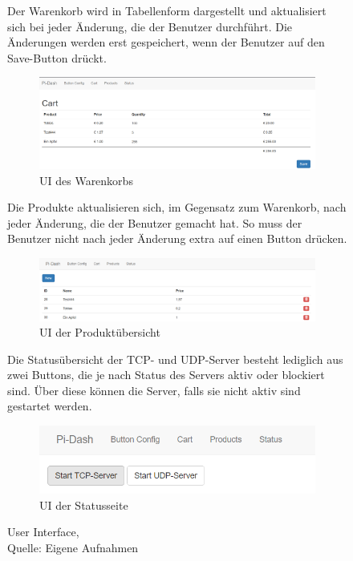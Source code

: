 \begin{figure}[!htb]
Der Warenkorb wird in Tabellenform dargestellt und aktualisiert sich bei jeder Änderung, die der Benutzer durchführt. Die Änderungen werden erst gespeichert, wenn der Benutzer auf den Save-Button drückt.	
  \begin{subfigure}{\linewidth}
	\centering
	\includegraphics[scale=0.4]{Bilder/ui_cart.png}
	\caption[UI des Warenkorbs]{\ac{UI} des Warenkorbs}
  \end{subfigure}\par\medskip
  
Die Produkte aktualisieren sich, im Gegensatz zum Warenkorb, nach jeder Änderung, die der Benutzer gemacht hat. So muss der Benutzer nicht nach jeder Änderung extra auf einen Button drücken.

  \begin{subfigure}{\linewidth}	
	\centering
	\includegraphics[scale=0.4]{Bilder/ui_products.png}
	\caption[UI der Produktübersicht]{\ac{UI} der Produktübersicht}
  \end{subfigure}\par\medskip
  
Die Statusübersicht der \ac{TCP}- und \ac{UDP}-Server besteht lediglich aus zwei Buttons, die je nach Status des Servers aktiv oder blockiert sind. Über diese können die Server, falls sie nicht aktiv sind gestartet werden.

  \begin{subfigure}{\linewidth}
	\centering
	\includegraphics[scale=0.8]{Bilder/ui_status.png}
	\caption[UI der Statusseite]{\ac{UI} der Statusseite}
  \end{subfigure}
  \caption{User Interface,\\ Quelle: Eigene Aufnahmen}
\end{figure}

